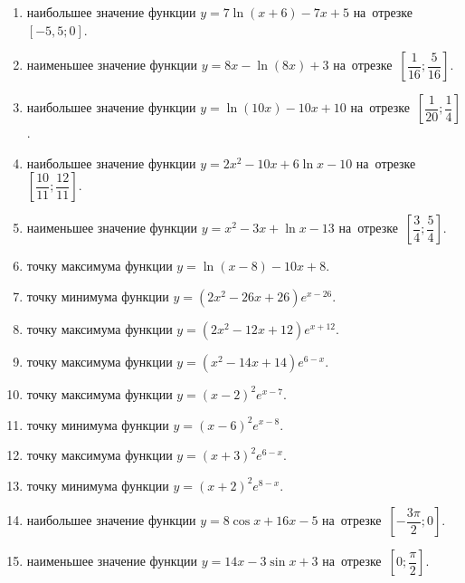 \documentclass[a4paper,10pt]{article}
\begin{document}
\begin{enumerate}
\item {} наибольшее значение функции $y=7\ln \left(x+6\right)-7x+5$ на~отрезке~$\left[-5,5;0\right]$.

\item {} наименьшее значение функции $y=8x-\ln \left(8x\right)+3$ на~отрезке~$\left[\dfrac{1}{16};\dfrac{5}{16}\right]$.

\item {} наибольшее значение функции $y=\ln \left(10x\right)-10x+10$ на~отрезке~$\left[\dfrac{1}{20};\dfrac{1}{4}\right]$.

\item {} наибольшее значение функции $y=2x^2-10x+6\ln x-10$ на~отрезке~$\left[\dfrac{10}{11};\dfrac{12}{11}\right]$.

\item {} наименьшее значение функции $y=x^2-3x+\ln x-13$ на~отрезке~$\left[\dfrac{3}{4};\dfrac{5}{4}\right]$.

\item {} точку максимума функции $y=\ln \left(x-8\right)-10x+8$.

\item {} точку минимума функции $y=\left(2x^2-26x+26\right)e^{x-26}$.

\item {} точку максимума функции $y=\left(2x^2-12x+12\right)e^{x+12}$.

\item {} точку максимума функции $y=\left(x^2-14x+14\right)e^{6-x}$.

\item {} точку максимума функции $y=\left(x-2\right)^2e^{x-7}$.

\item {} точку минимума функции $y=\left(x-6\right)^2e^{x-8}$.

\item {} точку максимума функции $y=\left(x+3\right)^2e^{6-x}$.

\item {} точку минимума функции $y=\left(x+2\right)^2e^{8-x}$.

\item {} наибольшее значение функции $y=8\cos x+16x-5$ на~отрезке~$\left[-\dfrac{3\pi }{2};0\right]$.

\item {} наименьшее значение функции $y=14x-3\sin x+3$ на~отрезке~$\left[0;\dfrac{\pi }{2}\right]$.


\end{enumerate}
\end{document}
